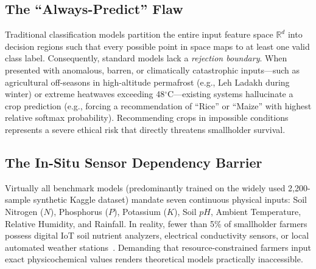 \documentclass[conference]{IEEEtran}
\begin{document}
\subsection{The ``Always-Predict'' Flaw}
Traditional classification models partition the entire input feature space $\mathbb{R}^d$ into decision regions such that every possible point in space maps to at least one valid class label. Consequently, standard models lack a \textit{rejection boundary}. When presented with anomalous, barren, or climatically catastrophic inputs—such as agricultural off-seasons in high-altitude permafrost (e.g., Leh Ladakh during winter) or extreme heatwaves exceeding 48$^\circ$C—existing systems hallucinate a crop prediction (e.g., forcing a recommendation of ``Rice'' or ``Maize'' with highest relative softmax probability). Recommending crops in impossible conditions represents a severe ethical risk that directly threatens smallholder survival.

\subsection{The In-Situ Sensor Dependency Barrier}
Virtually all benchmark models (predominantly trained on the widely used 2,200-sample synthetic Kaggle dataset) mandate seven continuous physical inputs: Soil Nitrogen ($N$), Phosphorus ($P$), Potassium ($K$), Soil $pH$, Ambient Temperature, Relative Humidity, and Rainfall. In reality, fewer than 5\% of smallholder farmers possess digital IoT soil nutrient analyzers, electrical conductivity sensors, or local automated weather stations~\cite{rao2022iot}. Demanding that resource-constrained farmers input exact physicochemical values renders theoretical models practically inaccessible.
\end{document}
